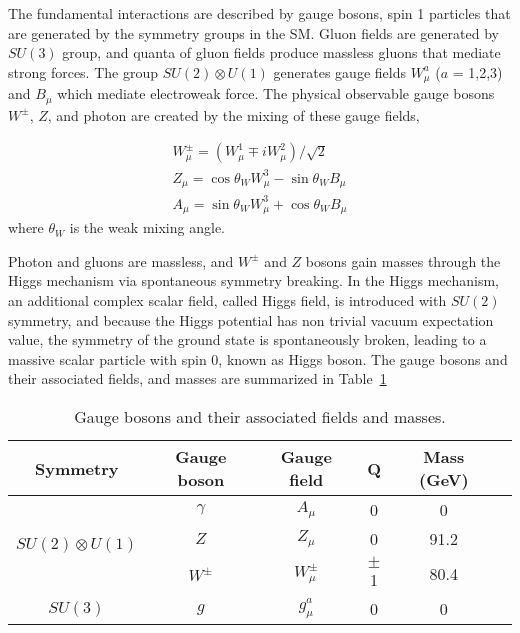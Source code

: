 The fundamental interactions are described by gauge bosons, spin 1 particles that are generated by the symmetry groups in the SM. Gluon fields are generated by $SU(3)$ group, and quanta of gluon fields produce massless gluons that mediate strong forces. The group $SU(2) \otimes U(1)$ generates gauge fields $W^{a}_{\mu}$ ($a$ = 1,2,3) and $B_{\mu}$ which mediate electroweak force. The physical observable gauge bosons $W^{\pm}$, $Z$, and photon are created by the mixing of these gauge fields, 

\begin{equation}
\label{eq:electroweak_mixing}
\begin{split}
	W^{\pm}_{\mu} = (W^{1}_{\mu} \mp iW^{2}_{\mu}) / \sqrt{2} \\
	Z_{\mu} = \cos \theta_{W} W^{3}_{\mu} - \sin\theta_{W} B_{\mu} \\
	A_{\mu} = \sin \theta_{W} W^{3}_{\mu} + \cos\theta_{W} B_{\mu}
\end{split}
\end{equation}
%
where $\theta_{W}$ is the weak mixing angle.

Photon and gluons are massless, and $W^{\pm}$ and $Z$ bosons gain masses through the Higgs mechanism via spontaneous symmetry breaking. In the Higgs mechanism, an additional complex scalar field, called Higgs field, is introduced with $SU(2)$ symmetry, and because the Higgs potential has non trivial vacuum expectation value, the symmetry of the ground state is spontaneously broken, leading to a massive scalar particle with spin 0, known as Higgs boson. The gauge bosons and their associated fields, and masses are summarized in Table~\ref{table:gauge_bosons}

\begin{table}[!htb]
  \centering
  \begin{tabular}{c c c c c c}
    \hline
    \hline
	Symmetry	& Gauge boson	& Gauge field	& Q & Mass (GeV) \\
	\hline
	\multirow{3}{*}{$SU(2) \otimes U(1)$} & $\gamma$  &	$A_{\mu}$       & 0	   	& 0 	\\
										  & $Z$		  &	$Z_{\mu}$       & 0	   	& 91.2 	\\
										  & $W^{\pm}$ &	$W_{\mu}^{\pm}$ & $\pm$1  & 80.4 	\\
	\hline
	$SU(3)$								  & $g$		  &	$g^{a}_{\mu}$   &  0		& 0		\\

    \hline
    \hline
  \end{tabular}
  \caption{Gauge bosons and their associated fields and masses.}
  \label{table:gauge_bosons}
\end{table}


